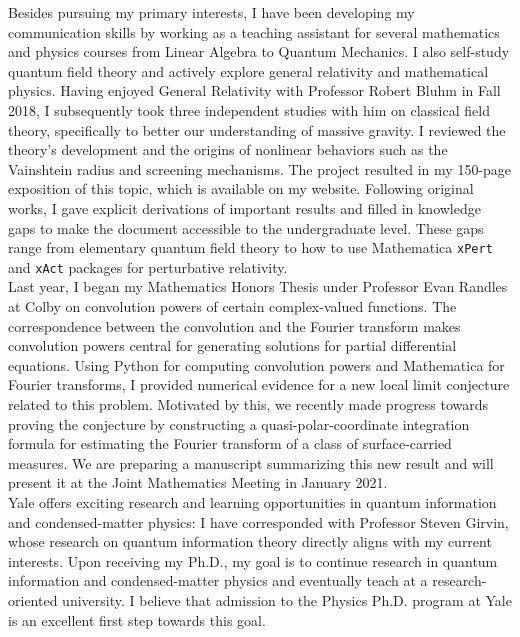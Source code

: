 \documentclass[12pt]{article}
\begin{document}
Besides pursuing my primary interests, I have been developing my communication skills by working as a teaching assistant for several mathematics and physics courses from Linear Algebra to Quantum Mechanics. I also self-study quantum field theory and actively explore general relativity and mathematical physics. Having enjoyed General Relativity with Professor Robert Bluhm in Fall 2018, I subsequently took three independent studies with him on classical field theory, specifically to better our understanding of massive gravity. I reviewed the theory's development and the origins of nonlinear behaviors such as the Vainshtein radius and screening mechanisms. The project resulted in my 150-page exposition of this topic, which is available on my website. Following original works, I gave explicit derivations of important results and filled in knowledge gaps to make the document accessible to the undergraduate level. These gaps range from elementary quantum field theory to how to use Mathematica \texttt{xPert} and \texttt{xAct} packages for perturbative relativity. \\ 

Last year, I began my Mathematics Honors Thesis under Professor Evan Randles at Colby on convolution powers of certain complex-valued functions. The correspondence between the convolution and the Fourier transform makes convolution powers central for generating solutions for partial differential equations. Using Python for computing convolution powers and Mathematica for Fourier transforms, I provided numerical evidence for a new local limit conjecture related to this problem. Motivated by this, we recently made progress towards proving the conjecture by constructing a quasi-polar-coordinate integration formula for estimating the Fourier transform of a class of surface-carried measures. We are preparing a manuscript summarizing this new result and will present it at the Joint Mathematics Meeting in January 2021. \\ 

Yale offers exciting research and learning opportunities in quantum information and condensed-matter physics: I have corresponded with Professor Steven Girvin, whose research on quantum information theory directly aligns with my current interests. Upon receiving my Ph.D., my goal is to continue research in quantum information and condensed-matter physics and eventually teach at a research-oriented university. I believe that admission to the Physics Ph.D. program at Yale is an excellent first step towards this goal.  

	

















	
	
	
	
	
\end{document}
